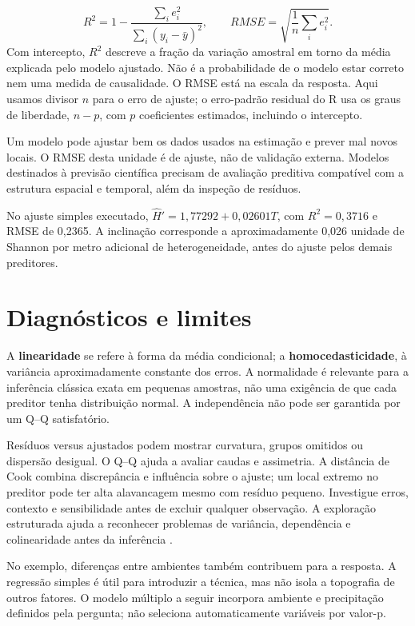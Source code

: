\begin{equation}R^2=1-\frac{\sum_i e_i^2}{\sum_i(y_i-\bar y)^2},
\qquad RMSE=\sqrt{\frac{1}{n}\sum_i e_i^2}.\end{equation}
Com intercepto, $R^2$ descreve a fração da variação amostral em torno da média explicada pelo modelo ajustado. Não é a probabilidade de o modelo estar correto nem uma medida de causalidade. O RMSE está na escala da resposta. Aqui usamos divisor $n$ para o erro de ajuste; o erro-padrão residual do R usa os graus de liberdade, $n-p$, com $p$ coeficientes estimados, incluindo o intercepto.

Um modelo pode ajustar bem os dados usados na estimação e prever mal novos locais. O RMSE desta unidade é de ajuste, não de validação externa. Modelos destinados à previsão científica precisam de avaliação preditiva compatível com a estrutura espacial e temporal, além da inspeção de resíduos.

No ajuste simples executado, $\widehat H'=1{,}77292+0{,}02601T$, com $R^2=0{,}3716$ e RMSE de 0,2365. A inclinação corresponde a aproximadamente 0,026 unidade de Shannon por metro adicional de heterogeneidade, antes do ajuste pelos demais preditores.

\section{Diagnósticos e limites}
A \textbf{linearidade} se refere à forma da média condicional; a \textbf{homocedasticidade}, à variância aproximadamente constante dos erros. A normalidade é relevante para a inferência clássica exata em pequenas amostras, não uma exigência de que cada preditor tenha distribuição normal. A independência não pode ser garantida por um Q--Q satisfatório.

Resíduos versus ajustados podem mostrar curvatura, grupos omitidos ou dispersão desigual. O Q--Q ajuda a avaliar caudas e assimetria. A distância de Cook combina discrepância e influência sobre o ajuste; um local extremo no preditor pode ter alta alavancagem mesmo com resíduo pequeno. Investigue erros, contexto e sensibilidade antes de excluir qualquer observação. A exploração estruturada ajuda a reconhecer problemas de variância, dependência e colinearidade antes da inferência \parencite{zuur2010}.

No exemplo, diferenças entre ambientes também contribuem para a resposta. A regressão simples é útil para introduzir a técnica, mas não isola a topografia de outros fatores. O modelo múltiplo a seguir incorpora ambiente e precipitação definidos pela pergunta; não seleciona automaticamente variáveis por valor-p.

